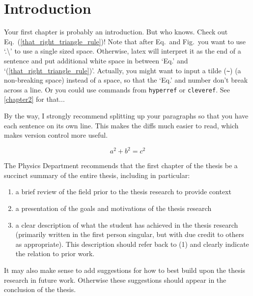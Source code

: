 \chapter{Introduction} \label{chapter1}
Your first chapter is probably an introduction. But who knows. Check out Eq.\ (\ref{that_right_triangle_rule})!
Note that after Eq.\ and Fig.\ you want to use `.\textbackslash'  to use a single sized space. Otherwise,
latex will interpret it as the end of a sentence and put additional white space in between `Eq.' and 
`(\ref{that_right_triangle_rule})'.
Actually, you might want to input a tilde (\texttt{\~}) (a non-breaking space) instead of a space, so that the `Eq.' and number don't break across a line.
Or you could use commands from \texttt{hyperref} or \texttt{cleveref}.
See \cref{chapter2} for that...

By the way, I strongly recommend splitting up your paragraphs so that you have each sentence on its own line.
This makes the diffs much easier to read, which makes version control more useful.

\begin{equation}
a^2 + b^2 = c^2 \label{that_right_triangle_rule}
\end{equation}

The Physics Department recommends that the first chapter of the thesis be 
a succinct summary of the entire thesis, including in particular:

\begin{enumerate}
  \item a brief review of the field prior to the thesis research to provide context
  \item a presentation of the goals and motivations of the thesis research 
  \item a clear description of what the student has achieved in the thesis research
 (primarily written in the first person singular, but with due credit to
 others as appropriate). This description should refer back to (1) and clearly indicate the relation
 to prior work.
\end{enumerate}
It may also make sense to add suggestions for how to best build upon the thesis research in future work. Otherwise these suggestions should appear in the conclusion of the thesis.
